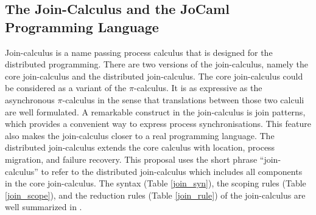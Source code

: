 \subsection{The Join-Calculus and the JoCaml Programming Language}
\label{sec:join}

Join-calculus \cite{RCHAM} is a name passing process calculus that is designed for the distributed programming.  There are two versions of the join-calculus, namely the core join-calculus and the distributed join-calculus.  The core join-calculus could be considered as a variant of the ${\pi}$-calculus.  It is as expressive as the asynchronous ${\pi}$-calculus in the sense that translations between those two calculi are well formulated.  A remarkable construct in the join-calculus is join patterns, which provides a convenient way to express process synchronisations.  This feature also makes the join-calculus closer to a real programming language.  The distributed join-calculus extends the core calculus with location, process migration, and failure recovery.  This proposal uses the short phrase ``join-calculus'' to refer to the distributed join-calculus which includes all components in the core join-calculus.  The syntax (Table \ref{join_syn}), the scoping rules (Table \ref{join_scope}), and the reduction rules (Table \ref{join_rule}) of the join-calculus are well summarized in \cite{join}.

